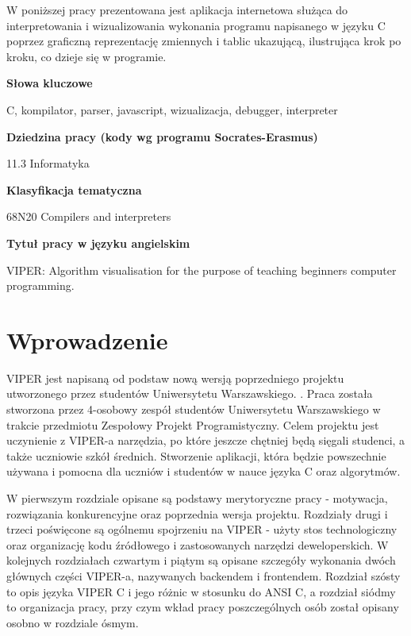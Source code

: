 \documentclass[a4paper,twoside,openright,11pt]{report}
\begin{document}
  \begin{titlepage}
  \null\nobreak\vfil
  \begin{center}%
    \bfseries\large \abstractname
  \end{center}
W poniższej pracy prezentowana jest aplikacja internetowa służąca do interpretowania i wizualizowania wykonania programu napisanego w języku C poprzez graficzną reprezentację zmiennych i tablic ukazującą, ilustrująca krok po kroku, co dzieje się w programie.  \vspace*{26pt}%
  \begin{center}%
    \bfseries\large Słowa kluczowe
  \end{center}
  C, kompilator, parser, javascript, wizualizacja, debugger, interpreter
  \vspace*{26pt}%
  \begin{center}%
    \bfseries\large Dziedzina pracy (kody wg programu Socrates-Erasmus)
  \end{center}
   11.3 Informatyka
  \vspace*{26pt}%
  \begin{center}%
    \bfseries\large Klasyfikacja tematyczna
  \end{center}
   68N20 Compilers and interpreters
  \vspace*{26pt}%
  \begin{center}%
    \bfseries\large Tytuł pracy w języku angielskim
  \end{center}
  VIPER: Algorithm visualisation for the purpose of teaching beginners computer programming.
  \nobreak\vfil\null\cleardoublepage
  \end{titlepage}

  \tableofcontents

  \chapter{Wprowadzenie}
\par VIPER jest napisaną od podstaw nową wersją poprzedniego projektu utworzonego przez studentów Uniwersytetu Warszawskiego. \cite{viper1}. Praca została stworzona przez 4-osobowy zespół studentów Uniwersytetu Warszawskiego w trakcie przedmiotu Zespołowy Projekt Programistyczny. Celem projektu jest uczynienie z VIPER-a narzędzia, po które jeszcze chętniej będą sięgali studenci, a także uczniowie szkół średnich. Stworzenie aplikacji, która będzie powszechnie używana i pomocna dla uczniów i studentów w nauce języka C oraz algorytmów. 
\par W pierwszym rozdziale opisane są podstawy merytoryczne pracy - motywacja, rozwiązania konkurencyjne oraz poprzednia wersja projektu. Rozdziały drugi i trzeci poświęcone są ogólnemu spojrzeniu na VIPER - użyty stos technologiczny oraz organizację kodu źródłowego i zastosowanych narzędzi deweloperskich. W kolejnych rozdziałach czwartym i piątym są opisane szczegóły wykonania dwóch głównych części VIPER-a, nazywanych backendem i frontendem. Rozdział szósty to opis języka VIPER C i jego różnic w stosunku do ANSI C, a rozdział siódmy to organizacja pracy, przy czym wkład pracy poszczególnych osób został opisany osobno w rozdziale ósmym.
\end{document}
